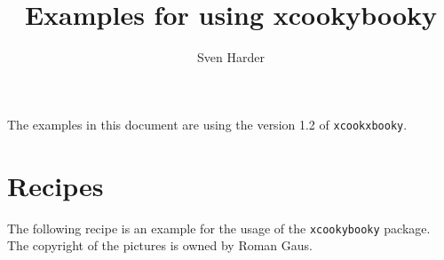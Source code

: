 \documentclass[%
a4paper,
11pt
]{article}
\begin{document}
\title{Examples for using \textbf{xcookybooky}}
\author{Sven Harder}
\maketitle

\begin{center}
    The examples in this document are using the version 1.2 of \texttt{xcookxbooky}.
\end{center}

\tableofcontents

\vspace{9em}

\section{Recipes}
The following recipe is an example for the usage of the \texttt{xcookybooky} package. The copyright of the pictures is owned by Roman Gaus.

\newpage



\end{document}
